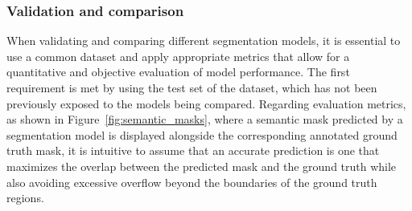 \subsubsection{Validation and comparison}
When validating and comparing different segmentation models, it is essential to use a common dataset and apply appropriate metrics that allow for a quantitative and objective evaluation of model performance. The first requirement is met by using the test set of the dataset, which has not been previously exposed to the models being compared. Regarding evaluation metrics, as shown in Figure~\ref{fig:semantic_masks}, where a semantic mask predicted by a segmentation model is displayed alongside the corresponding annotated ground truth mask, it is intuitive to assume that an accurate prediction is one that maximizes the overlap between the predicted mask and the ground truth while also avoiding excessive overflow beyond the boundaries of the ground truth regions.

